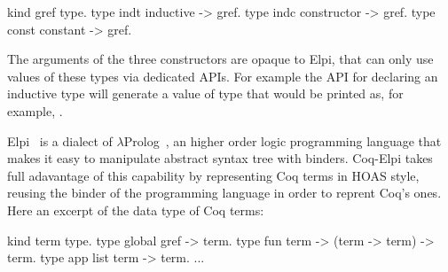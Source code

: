 \documentclass[a4paper,UKenglish,cleveref, autoref]{lipics-v2019}
\begin{document}
\begin{elpicode}
kind gref  type.
type indt  inductive -> gref.    %
type indc  constructor -> gref.  %
type const constant -> gref.     %
\end{elpicode}

The arguments of the three constructors are opaque to Elpi, that can only use
values of these types via dedicated APIs. For example the API for declaring
an inductive type will generate a value of type  that
would be printed as, for example, .

Elpi~\cite{DBLP:conf/lpar/DunchevGCT15} is a dialect
of $\lambda$Prolog~\cite{Miller:2012:PHL:2331097}, an higher order
logic programming language that makes it easy to manipulate abstract syntax
tree with binders. Coq-Elpi takes full adavantage of this capability by
representing Coq terms in HOAS style, reusing the binder of the programming
language in order to reprent Coq's ones. Here an excerpt of the data
type of Coq terms:

\begin{elpicode}
kind term type.
type global gref -> term.                    %
type fun    term -> (term -> term) -> term.  %
type app    list term -> term.               %
... %
\end{elpicode}
\end{document}

